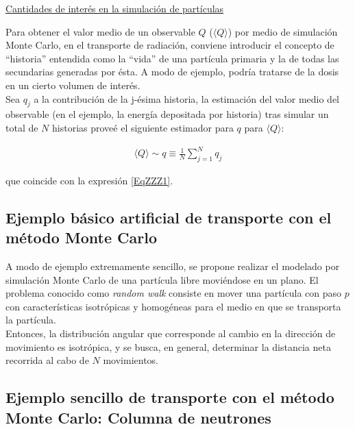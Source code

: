 \begin{center}
\underline{Cantidades de inter\'es en la simulaci\'on de part\'iculas}
\end{center}

Para obtener el valor medio de un observable $Q$ ($ \langle Q \rangle $) por medio de simulaci\'on Monte Carlo, en el transporte de 
radiaci\'on, conviene introducir el concepto de ``historia'' entendida como la ``vida'' de una part\'icula primaria y la de todas las 
secundarias generadas por \'esta. 
%
A modo de ejemplo, podr\'ia tratarse de la dosis en un cierto volumen de inter\'es. \\
%
%
Sea $q_{j}$ a la contribuci\'on de la j-\'esima historia, la estimaci\'on del valor medio del observable (en el ejemplo, la energ\'ia 
depositada por historia) tras simular un total de $N$ historias prove\'e el siguiente estimador para $q$ para $\langle Q \rangle$:

\begin{eqnarray}
 	\langle Q \rangle \sim q \equiv \frac{1}{N} \sum_{j=1} ^{N} q_{j}
 \label{EqZZZ24} 
\end{eqnarray}

que coincide con la expresi\'on \ref{EqZZZ1}. \\
%
%


\subsection{Ejemplo b\'asico artificial de transporte con el m\'etodo Monte Carlo}
\label{CapVII_12}


A modo de ejemplo extremamente sencillo, se propone realizar el modelado por simulaci\'on Monte Carlo de una part\'icula libre movi\'endose
en un plano. 
%
El problema conocido como \textit{random walk} consiste en mover una part\'icula con paso $p$ con caracter\'isticas isotr\'opicas y 
homog\'eneas para el medio en que se transporta la part\'icula. \\
%
%
Entonces, la distribuci\'on angular que corresponde al cambio en la direcci\'on de movimiento es isotr\'opica, y se busca, en general,
determinar la distancia neta recorrida al cabo de $N$ movimientos. \\
%
%

\subsection{Ejemplo sencillo de transporte con el m\'etodo Monte Carlo: Columna de neutrones}
\label{CapVII_13}

